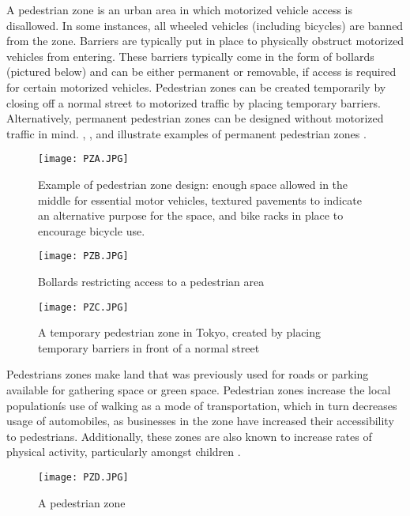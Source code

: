 A pedestrian zone is an urban area in which motorized vehicle access is disallowed. In some instances, all wheeled vehicles (including bicycles) are banned from the zone. Barriers are typically put in place to physically obstruct motorized vehicles from entering. These barriers typically come in the form of bollards (pictured below) and can be either permanent or removable, if access is required for certain motorized vehicles. Pedestrian zones can be created temporarily by closing off a normal street to motorized traffic by placing temporary barriers. Alternatively, permanent pedestrian zones can be designed without motorized traffic in mind. , , and  illustrate examples of permanent pedestrian zones \cite{PZ4}.
 
\begin{figure}[h]
\centering
\texttt{[image: PZA.JPG]}
\caption[Example of pedestrian zone design]{Example of pedestrian zone design: enough space allowed in the middle for essential motor vehicles, textured pavements to indicate an alternative purpose for the space, and bike racks in place to encourage bicycle use.}\label{fig:PZA}
\end{figure}

\begin{figure}[h]
\centering
\texttt{[image: PZB.JPG]}
\caption[Bollards restricting access to a pedestrian area]{Bollards restricting access to a pedestrian area}\label{fig:PZB}
\end{figure}

\begin{figure}[h]
\centering
\texttt{[image: PZC.JPG]}
\caption[A temporary pedestrian zone in Tokyo]{A temporary pedestrian zone in Tokyo, created by placing temporary barriers in front of a normal street}\label{fig:PZC}
\end{figure}

Pedestrians zones make land that was previously used for roads or parking available for gathering space or green space. Pedestrian zones increase the local populationís use of walking as a mode of transportation, which in turn decreases usage of automobiles, as businesses in the zone have increased their accessibility to pedestrians. Additionally, these zones are also known to increase rates of physical activity, particularly amongst children \cite{PZ4}.
 
\begin{figure}[h]
\centering
\texttt{[image: PZD.JPG]}
\caption[A pedestrian zone]{A pedestrian zone}\label{fig:PZD}
\end{figure}

